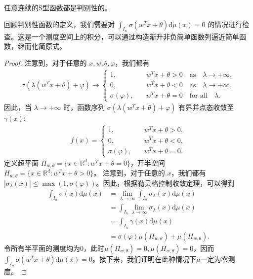 \documentclass[12pt]{article}
\begin{document}
\begin{mylemma}
任意连续的S型函数都是判别性的。
\end{mylemma}
回顾判别性函数的定义，我们需要对 $\int_{I_n} \sigma(w^Tx+\theta)\mathrm{d}\mu(x)=0$ 的情况进行检查。这是一个测度空间上的积分，可以通过构造渐升非负简单函数列逼近简单函数，继而化简原式。

\begin{proof}
    注意到，对于任意的 $x,w,\theta,\varphi$，我们都有
\begin{align*}
    \sigma(\lambda (w^T x + \theta) + \varphi) \rightarrow 
\begin{cases}
1, &  \quad w^T x + \theta > 0 \quad \text{as} \quad \lambda \to +\infty, \\
0, &  \quad w^T x + \theta < 0 \quad \text{as} \quad \lambda \to +\infty, \\
\sigma(\varphi), & \quad w^T x + \theta = 0 \quad \text{for all} \quad \lambda.
\end{cases}
\end{align*}
因此，当 $\lambda\to +\infty$ 时，函数序列 $\sigma(\lambda (w^T x + \theta) + \varphi)$ 有界并点态收敛至 $\gamma(x)$:
\begin{align*}
    f(x) = 
\begin{cases}
1, & \quad w^T x + \theta > 0, \\
0, & \quad w^T x + \theta < 0, \\
\sigma(\varphi), & \quad w^T x + \theta = 0.
\end{cases}
\end{align*}
定义超平面 $\Pi_{w,\theta}=\{x\in \mathbb{R}^d: w^Tx+\theta=0\}$，开半空间 $H_{w,\theta}=\{x\in \mathbb{R}^d: w^Tx+\theta>0\}$。 
注意到，对于任意的 $x$，我们都有 $|\sigma_\lambda(x)|\leq \max(1,\sigma(\varphi))$。因此，根据勒贝格控制收敛定理，可以得到
\begin{align*}
    \int_{I_n} \sigma(x)\mathrm{d}\mu(x)&=\lim_{\lambda\to \infty} \int_{I_n} \sigma_\lambda(x)\mathrm{d}\mu(x)\\
    &= \int_{I_n} \lim_{\lambda\to \infty} \sigma_\lambda(x)\mathrm{d}\mu(x)\\
    &=\int_{I_n} \gamma(x) \mathrm{d}\mu(x)\\
    &=\sigma(\varphi)\mu(\Pi_{w,\theta})+\mu(H_{w,\theta}).
\end{align*}
令所有半平面的测度均为0，此时$\mu(\Pi_{w,\theta})=0, \mu(H_{w,\theta})=0$，因而 $\int_{I_n} \sigma(w^Tx+\theta)\mathrm{d}\mu(x)=0$。接下来，我们证明在此种情况下$\mu$一定为零测度。


\end{proof}
\end{document}
